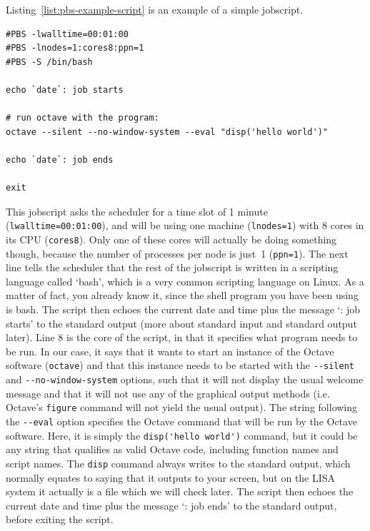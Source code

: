 Listing~\ref{list:pbs-example-script} is an example of a simple jobscript.


\begin{lstlisting}[style=basic,style=bash,style=numbered,caption={Example of a jobscript.},label=list:pbs-example-script]
#PBS -lwalltime=00:01:00
#PBS -lnodes=1:cores8:ppn=1
#PBS -S /bin/bash

echo `date`: job starts

# run octave with the program:
octave --silent --no-window-system --eval "disp('hello world')"

echo `date`: job ends

exit
\end{lstlisting}

This jobscript asks the scheduler for a time slot of 1 minute (\lstinline[style=bashinline]{lwalltime=00:01:00}), and will be using one machine (\lstinline[style=bashinline]{lnodes=1}) with 8 cores in its CPU (\lstinline[style=bashinline]{cores8}). Only one of these cores will actually be doing something though, because the number of processes per node is just~1 (\lstinline[style=bashinline]{ppn=1}). The next line tells the scheduler that the rest of the jobscript is written in a scripting language called `bash', which is a very common scripting language on Linux. As a matter of fact, you already know it, since the shell program you have been using is bash. The script then echoes the current date and time plus the message `: job starts' to the standard output (more about standard input and standard output later).  Line 8 is the core of the script, in that it specifies what program needs to be run. In our case, it says that it wants to start an instance of the Octave software (\lstinline[style=bashinline]{octave}) and that this instance needs to be started with the \lstinline[style=bashinline]{--silent} and \lstinline[style=bashinline]{--no-window-system} options, such that it will not display the usual welcome message and that it will not use any of the graphical output methods (i.e.\, Octave's \lstinline[style=bashinline]{figure} command will not yield the usual output). The string following the \lstinline[style=bashinline]{--eval} option specifies the Octave command that will be run by the Octave software. Here, it is simply the \lstinline[style=bashinline]{disp('hello world')} command, but it could be any string that qualifies as valid Octave code, including function names and script names. The \lstinline[style=bashinline]{disp} command always writes to the standard output, which normally equates to saying that it outputs to your screen, but on the LISA system it actually is a file which we will check later. The script then echoes the current date and time plus the message `: job ends' to the standard output, before exiting the script.

